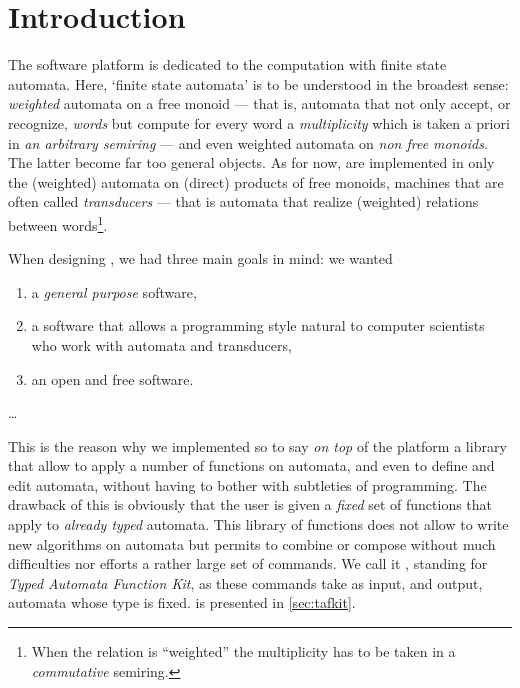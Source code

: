 \chapter*{Introduction}
\label{sec:intro}

The \Vauc software platform is dedicated to the computation with
finite state automata.  Here, `finite state automata' is to be
understood in the broadest sense: \emph{weighted} automata on a free
monoid --- that is, automata that not only accept, or recognize,
\emph{words} but compute for every word a \emph{multiplicity} which is
taken a priori in \emph{an arbitrary semiring} --- and even weighted
automata on \emph{non free monoids}.  The latter become far too
general objects.  As for now, are implemented in \Vauc only the
(weighted) automata on (direct) products of free monoids, machines
that are often called \emph{transducers} --- that is automata that
realize (weighted) relations between words\footnote{When the relation
  is ``weighted'' the multiplicity has to be taken in a
  \emph{commutative} semiring.}.

When designing \Vauc, we had three main goals in mind: we wanted
\begin{enumerate}
\item a \emph{general purpose} software,
\item a software that allows a programming style natural to computer
  scientists who work with automata and transducers,
\item  an open and free software.
\end{enumerate}
\ldots

This is the reason why we implemented so to say \emph{on top} of the
\Vauc platform a library that allow to apply a number of functions on
automata, and even to define and edit automata, without having to
bother with subtleties of \Cxx programming.  The drawback of this is
obviously that the user is given a \emph{fixed} set of functions that
apply to \emph{already typed} automata.  This library of functions
does not allow to write new algorithms on automata but permits to
combine or compose without much difficulties nor efforts a rather
large set of commands.  We call it \tafkit, standing for \emph{Typed
  Automata Function Kit}, as these commands take as input, and output,
automata whose type is fixed.  \tafkit is presented in
\autoref{sec:tafkit}.


